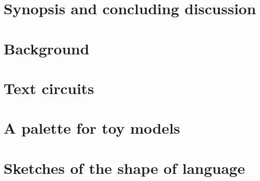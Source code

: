 



\maketitle%

\tableofcontents{}

\setcounter{chapter}{-1}
\chapter{Synopsis and concluding discussion}
\newpage

\newpage

\chapter{Background}\label{chapter:stringdiagrams}
\newpage
\label{sec:proctheory}
\newpage

\newpage

\chapter{Text circuits}\label{chapter:textcircuits}
\newpage
\label{sec:ncat}
\newpage

\newpage

\newpage


\chapter{A palette for toy models}\label{chapter:contrel}
\newpage

\newpage

\newpage

\newpage
\label{sec:topconcepts}

\newpage
\chapter{Sketches of the shape of language}\label{chapter:sketches}
\newpage
\label{sec:lassos}
\newpage

\newpage










